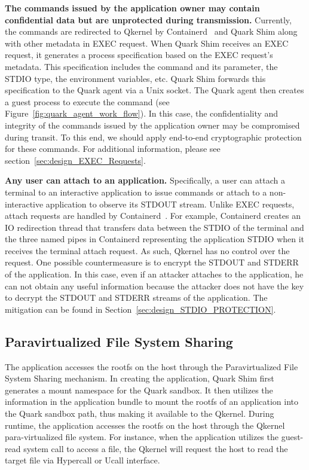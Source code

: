 \textbf{The commands issued by the application owner may contain confidential data but are unprotected during transmission.} Currently, the commands are redirected to Qkernel by Containerd~\cite*{containerd} and Quark Shim along with other metadata in EXEC request. When Quark Shim receives an EXEC request, it generates 
a process specification based on the EXEC request’s metadata. This specification includes the command and its parameter, the STDIO type, the environment variables, etc. Quark Shim forwards this specification to the Quark agent via a Unix socket. The Quark agent then creates a guest process to 
execute the command (see Figure~\ref{fig:quark_agent_work_flow}). In this case, the confidentiality and integrity of the commands issued by the application owner may be compromised during transit. To this end, we should apply end-to-end cryptographic protection for these 
commands. For additional information, please see section~\ref{sec:design_EXEC_Requests}.



\textbf{Any user can attach to an application.} Specifically, a user can attach a terminal to an interactive application to issue commands or attach to a non-interactive application to observe its STDOUT stream. Unlike EXEC requests, attach requests are handled by Containerd~\cite*{containerd}. For example, Containerd creates an IO redirection thread that 
transfers data between the STDIO of the terminal and the three named pipes in Containerd representing the application STDIO when it receives the terminal attach request. As such, Qkernel has no control over the request. One possible countermeasure is to encrypt the STDOUT and STDERR of the application. In this case, even if an attacker attaches to the application, he 
can not obtain any useful information because the attacker does not have the key to decrypt the STDOUT and STDERR streams of the application. The mitigation can be found in Section~\ref{sec:design_STDIO_PROTECTION}.

 

\subsection{Paravirtualized File System Sharing}
The application accesses the rootfs on the host through the Paravirtualized File System Sharing mechanism. In creating the application, Quark Shim first generates a mount namespace for the Quark sandbox. It then utilizes the information in the application bundle to mount the rootfs of an application 
into the Quark sandbox path, thus making it available to the Qkernel. During runtime, the application accesses the rootfs on the host through the Qkernel para-virtualized file system. For instance, when the application utilizes the guest-read system call to access a file, the Qkernel will request 
the host to read the target file via Hypercall or Ucall interface. 


